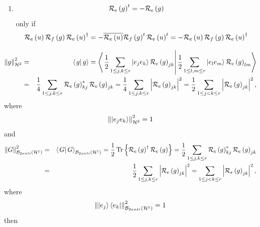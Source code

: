 \begin{theorem}
\begin{remark}
\begin{enumerate}
\begin{enumerate}
\item 
\begin{equation}
{\cal R}_{e}\left( g\right) ^{t}=-{\cal R}_{e}\left( g\right)
\end{equation}%
only if 
\begin{equation}
{\cal R}_{e}\left( u\right) {\cal R}_{f}\left( g\right) {\cal R}_{e}\left(
u\right) ^{\dagger }=-\overline{{\cal R}_{e}\left( u\right) }{\cal R}%
_{f}\left( g\right) ^{t}{\cal R}_{e}\left( u\right) ^{t}=-{\cal R}_{e}\left(
u\right) {\cal R}_{f}\left( g\right) {\cal R}_{e}\left( u\right) ^{\dagger }
\end{equation}
\end{enumerate}
\end{enumerate}
\end{remark}
\end{theorem}

\begin{eqnarray}
\left\Vert g\right\Vert _{{\cal H}^{2}}^{2} &=&\left\langle \left.
g\right\vert g\right\rangle =\left\langle \left. \frac{1}{2}\sum_{1\leq
j,k\leq r}\left\vert e_{j}e_{k}\right\rangle {\cal R}_{e}\left( g\right)
_{jk}\right\vert \frac{1}{2}\sum_{1\leq l,m\leq r}\left\vert
e_{l}e_{m}\right\rangle {\cal R}_{e}\left( g\right) _{lm}\right\rangle \\
&=&\frac{1}{4}\sum_{1\leq j,k\leq r}{\cal R}_{e}\left( g\right) _{kj}^{\ast }%
{\cal R}_{e}\left( g\right) _{jk}=\frac{1}{4}\sum_{1\leq j,k\leq
r}\left\vert {\cal R}_{e}\left( g\right) _{jk}\right\vert ^{2}=\frac{1}{2}%
\sum_{1\leq j<k\leq r}\left\vert {\cal R}_{e}\left( g\right)
_{jk}\right\vert ^{2},
\end{eqnarray}%
where 
\begin{equation}
\left\Vert \left\vert e_{j}e_{k}\right\rangle \right\Vert _{{\cal H}%
^{2}}^{2}=1
\end{equation}%
and 
\begin{eqnarray}
\left\Vert G\right\Vert _{{\cal B}_{2anti}\left( {\cal H}^{1}\right) }^{2}
&=&\left\langle \left. G\right\vert G\right\rangle _{{\cal B}_{2anti}\left( 
{\cal H}^{1}\right) }=\frac{1}{2}%
\mathop{\rm Tr}%
\left\{ {\cal R}_{e}\left( g\right) ^{\dagger }{\cal R}_{e}\left( g\right)
\right\} =\frac{1}{2}\sum_{1\leq j,k\leq r}{\cal R}_{e}\left( g\right)
_{kj}^{\ast }{\cal R}_{e}\left( g\right) _{jk} \\
&=&\frac{1}{2}\sum_{1\leq j,k\leq r}\left\vert {\cal R}_{e}\left( g\right)
_{jk}\right\vert ^{2}=\sum_{1\leq j<k\leq r}\left\vert {\cal R}_{e}\left(
g\right) _{jk}\right\vert ^{2},
\end{eqnarray}%
where 
\begin{equation}
\left\Vert \left\vert e_{j}\right\rangle \left\langle e_{k}\right\vert
\right\Vert _{{\cal B}_{2anti}\left( {\cal H}^{1}\right) }^{2}=1
\end{equation}%
then

